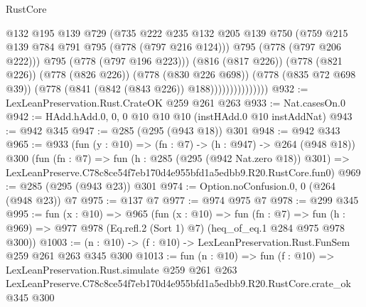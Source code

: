 \begin{lexlean}{RustCore}
\begin{coremodule}
                                @132
                                @195
                                @139
                                @729
                                (@735
                                  @222
                                  @235
                                  @132
                                  @205
                                  @139
                                  @750
                                  (@759 @215 @139 @784 @791 @795 (@778 (@797 @216 @124)))
                                  @795
                                  (@778 (@797 @206 @222)))
                                @795
                                (@778 (@797 @196 @223)))
                              (@816 (@817 @226))
                              (@778 (@821 @226))
                              (@778 (@826 @226))
                              (@778 (@830 @226 @698))
                              (@778 (@835 @72 @698 @39))
                              (@778 (@841 (@842 (@843 @226)) @188)))))))))))))))
@932 := LexLeanPreservation.Rust.CrateOK @259 @261 @263
@933 := Nat.casesOn.{0}
@942 := HAdd.hAdd.{0, 0, 0} @10 @10 @10 (instHAdd.{0} @10 instAddNat)
@943 := @942 @345
@947 := @285 (@295 (@943 @18)) @301
@948 := @942 @343
@965 := @933
    (fun (y : @10) => (fn : @7) -> (h : @947) -> @264 (@948 @18))
    @300
    (fun (fn : @7) =>
    fun (h : @285 (@295 (@942 Nat.zero @18)) @301) =>
    LexLeanPreserve.C78c8ce54f7eb170d4e955bfd1a5edbb9.R20.RustCore.fun0)
@969 := @285 (@295 (@943 @23)) @301
@974 := Option.noConfusion.{0, 0} (@264 (@948 @23)) @7
@975 := @137 @7
@977 := @974 @975 @7
@978 := @299 @345
@995 := fun (x : @10) =>
  @965
    (fun (x : @10) =>
    fun (fn : @7) =>
    fun (h : @969) => @977 @978 (Eq.refl.{2} (Sort 1) @7) (heq_of_eq.{1} @284 @975 @978 @300))
@1003 := (n : @10) -> (f : @10) -> LexLeanPreservation.Rust.FunSem @259 @261 @263 @345 @300
@1013 := fun (n : @10) =>
  fun (f : @10) =>
  LexLeanPreservation.Rust.simulate
    @259
    @261
    @263
    LexLeanPreserve.C78c8ce54f7eb170d4e955bfd1a5edbb9.R20.RustCore.crate_ok
    @345
    @300
\end{coremodule}
\end{lexlean}
